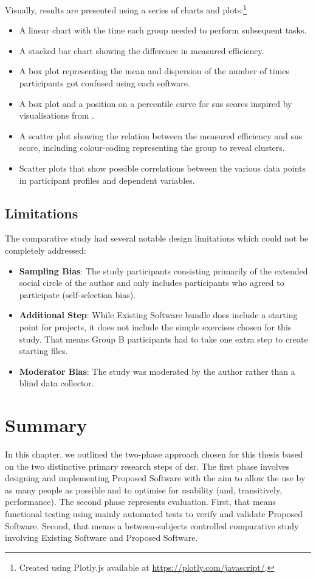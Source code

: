 Visually, results are presented using a series of charts and plots:\footnote{Created using Plotly.js available at \url{https://plotly.com/javascript/}.}

\begin{itemize}
    \item A linear chart with the time each group needed to perform subsequent tasks.
    \item A stacked bar chart showing the difference in measured efficiency.
    \item A box plot representing the mean and dispersion of the number of times participants got confused using each software.
    \item A box plot and a position on a percentile curve for \gls{sus} scores inspired by visualisations from \textcite{Blattgerste_2022}.
    \item A scatter plot showing the relation between the measured efficiency and \gls{sus} score, including colour-coding representing the group to reveal clusters.
    \item Scatter plots that show possible correlations between the various data points in participant profiles and dependent variables.
\end{itemize}

\subsection{Limitations}

The comparative study had several notable design limitations which could not be completely addressed:

\begin{itemize}
    \item \textbf{Sampling Bias}: The study participants consisting primarily of the extended social circle of the author and only includes participants who agreed to participate (self-selection bias).
    \item \textbf{Additional Step}: While Existing Software bundle does include a starting point for projects, it does not include the simple exercises chosen for this study. That means Group B participants had to take one extra step to create starting files.
    \item \textbf{Moderator Bias}: The study was moderated by the author rather than a blind data collector.
\end{itemize}

\section{Summary}

In this chapter, we outlined the two-phase approach chosen for this thesis based on the two distinctive primary research steps of \gls{dsr}.
The first phase involves designing and implementing Proposed Software with the aim to allow the use by as many people as possible and to optimise for usability (and, transitively, performance).
The second phase represents evaluation.
First, that means functional testing using mainly automated tests to verify and validate Proposed Software.
Second, that means a between-subjects controlled comparative study involving Existing Software and Proposed Software.
